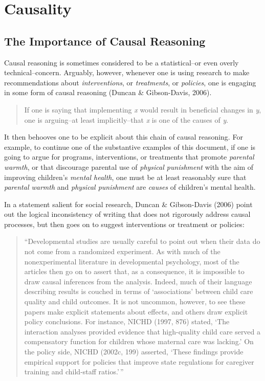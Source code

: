 \documentclass[
  letterpaper,
  DIV=11,
  numbers=noendperiod]{scrreprt}
\begin{document}
\hypertarget{causality}{%
\section{Causality}\label{causality}}

\hypertarget{the-importance-of-causal-reasoning}{%
\subsection{The Importance of Causal
Reasoning}\label{the-importance-of-causal-reasoning}}

Causal reasoning is sometimes considered to be a statistical--or even
overly technical--concern. Arguably, however, whenever one is using
research to make recommendations about \emph{interventions}, or
\emph{treatments}, or \emph{policies}, one is engaging in some form of
causal reasoning (Duncan \& Gibson-Davis, 2006).

\begin{quote}
If one is saying that implementing \emph{x} would result in beneficial
changes in \emph{y}, one is arguing--at least implicitly--that \emph{x}
is one of the causes of \emph{y}.
\end{quote}

It then behooves one to be explicit about this chain of causal
reasoning. For example, to continue one of the substantive examples of
this document, if one is going to argue for programs, interventions, or
treatments that promote \emph{parental warmth}, or that discourage
parental use of \emph{physical punishment} with the aim of improving
children's \emph{mental health}, one must be at least reasonably sure
that \emph{parental warmth} and \emph{physical punishment} are
\emph{causes} of children's mental health.

In a statement salient for social research, Duncan \& Gibson-Davis
(2006) point out the logical inconsistency of writing that does not
rigorously address causal processes, but then goes on to suggest
interventions or treatment or policies:

\begin{quote}
``Developmental studies are usually careful to point out when their data
do not come from a randomized experiment. As with much of the
nonexperimental literature in developmental psychology, most of the
articles then go on to assert that, as a consequence, it is impossible
to draw causal inferences from the analysis. Indeed, much of their
language describing results is couched in terms of `associations'
between child care quality and child outcomes. It is not uncommon,
however, to see these papers make explicit statements about effects, and
others draw explicit policy conclusions. For instance, NICHD (1997, 876)
stated, `The interaction analyses provided evidence that high-quality
child care served a compensatory function for children whose maternal
care was lacking.' On the policy side, NICHD (2002c, 199) asserted,
`These findings provide empirical support for policies that improve
state regulations for caregiver training and child-staff ratios.'\,''
\end{quote}
\end{document}
